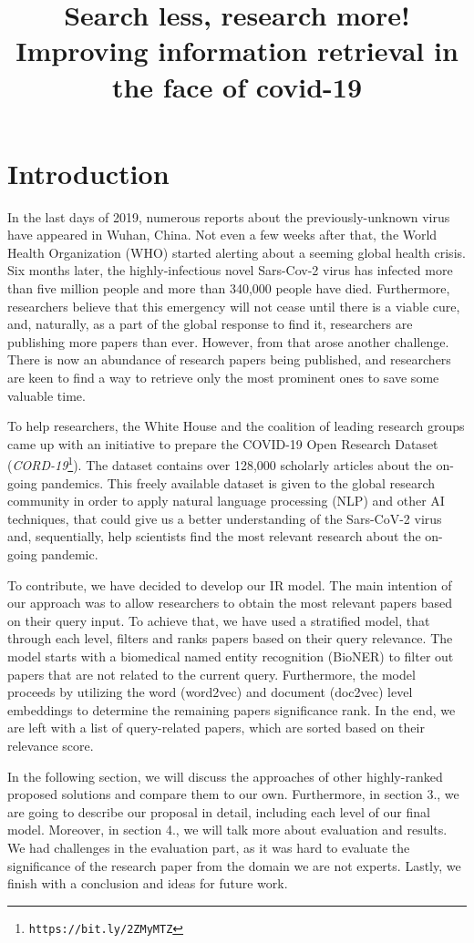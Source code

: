 \documentclass[10pt, a4paper]{article}
\title{
Search less, research more!\\
Improving information retrieval in the face of covid-19\\
}
\begin{document}
\maketitleabstract

\section{Introduction}

In the last days of 2019, numerous reports about the previously-unknown virus have appeared in Wuhan, China. Not even a few weeks after that, the World Health Organization (WHO) started alerting about a seeming global health crisis. Six months later, the highly-infectious novel Sars-Cov-2 virus has infected more than five million people and more than 340,000 people have died. Furthermore, researchers believe that this emergency will not cease until there is a viable cure, and, naturally, as a part of the global response to find it, researchers are publishing more papers than ever. However, from that arose another challenge. There is now an abundance of research papers being published, and researchers are keen to find a way to retrieve only the most prominent ones to save some valuable time.

To help researchers, the White House and the coalition of leading research groups came up with an initiative to prepare the COVID-19 Open Research Dataset (\emph{CORD-19}\footnote{\texttt{https://bit.ly/2ZMyMTZ}}). The dataset contains over 128,000 scholarly articles about the on-going pandemics. This freely available dataset is given to the global research community in order to apply natural language processing (NLP) and other AI techniques, that could give us a better understanding of the Sars-CoV-2 virus and, sequentially, help scientists find the most relevant research about the on-going pandemic.

To contribute, we have decided to develop our IR model. The main intention of our approach was to allow researchers to obtain the most relevant papers based on their query input. To achieve that, we have used a stratified model, that through each level, filters and ranks papers based on their query relevance.  The model starts with a biomedical named entity recognition (BioNER) to filter out papers that are not related to the current query. Furthermore, the model proceeds by utilizing the word (word2vec) and document (doc2vec) level embeddings to determine the remaining papers significance rank. In the end, we are left with a list of query-related papers, which are sorted based on their relevance score.

In the following section, we will discuss the approaches of other highly-ranked proposed solutions and compare them to our own. Furthermore, in section 3., we are going to describe our proposal in detail, including each level of our final model. Moreover, in section 4., we will talk more about evaluation and results.  We had challenges in the evaluation part, as it was hard to evaluate the significance of the research paper from the domain we are not experts. Lastly, we finish with a conclusion and ideas for future work.
\end{document}
